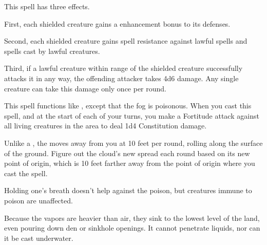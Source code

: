 \begin{spelleffect}
  This spell has three effects.
  \par First, each shielded creature gains a  enhancement bonus to its defenses.
  \par Second, each shielded creature gains spell resistance against lawful spells and spells cast by lawful creatures.
  \par Third, if a lawful creature within \rngmed range of the shielded creature successfully attacks it in any way, the offending attacker takes 4d6 damage. Any single creature can take this damage only once per round.
\end{spelleffect}

\begin{spelleffect}
  This spell functions like , except that the fog is poisonous. When you cast this spell, and at the start of each of your turns, you make a Fortitude attack against all living creatures in the area to deal 1d4 Constitution damage.
  \par Unlike a , the  moves away from you at 10 feet per round, rolling along the surface of the ground. Figure out the cloud's new spread each round based on its new point of origin, which is 10 feet farther away from the point of origin where you cast the spell.
\end{spelleffect}
\begin{spellnotes}
  Holding one's breath doesn't help against the poison, but creatures immune to poison are unaffected.
  \par Because the vapors are heavier than air, they sink to the lowest level of the land, even pouring down den or sinkhole openings. It cannot penetrate liquids, nor can it be cast underwater.
\end{spellnotes}

